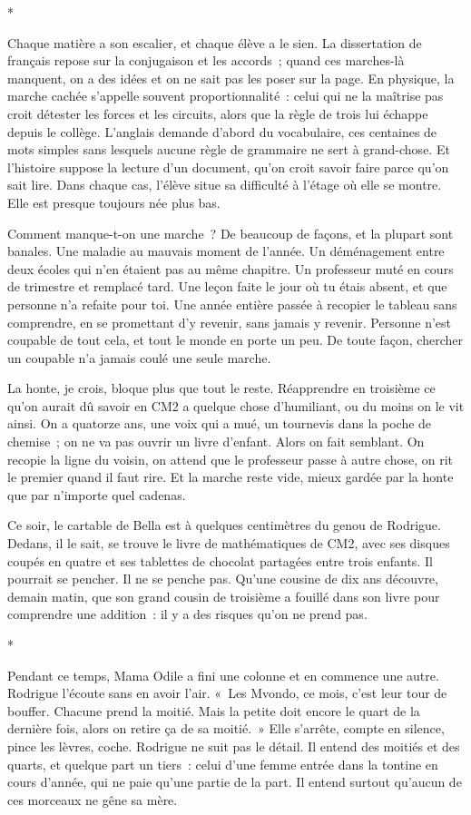 \documentclass[10.5pt,twoside,openright]{book}
\newcommand{\asterisme}{\par\vspace{0.7em}\centerline{\color{gris}*\quad*\quad*}\vspace{0.7em}\par\noindent}
\begin{document}
\asterisme

Chaque matière a son escalier, et chaque élève a le sien. La dissertation de français repose sur la conjugaison et les accords ; quand ces marches-là manquent, on a des idées et on ne sait pas les poser sur la page. En physique, la marche cachée s’appelle souvent proportionnalité : celui qui ne la maîtrise pas croit détester les forces et les circuits, alors que la règle de trois lui échappe depuis le collège. L’anglais demande d’abord du vocabulaire, ces centaines de mots simples sans lesquels aucune règle de grammaire ne sert à grand-chose. Et l’histoire suppose la lecture d’un document, qu’on croit savoir faire parce qu’on sait lire. Dans chaque cas, l’élève situe sa difficulté à l’étage où elle se montre. Elle est presque toujours née plus bas.

Comment manque-t-on une marche ? De beaucoup de façons, et la plupart sont banales. Une maladie au mauvais moment de l’année. Un déménagement entre deux écoles qui n’en étaient pas au même chapitre. Un professeur muté en cours de trimestre et remplacé tard. Une leçon faite le jour où tu étais absent, et que personne n’a refaite pour toi. Une année entière passée à recopier le tableau sans comprendre, en se promettant d’y revenir, sans jamais y revenir. Personne n’est coupable de tout cela, et tout le monde en porte un peu. De toute façon, chercher un coupable n’a jamais coulé une seule marche.

La honte, je crois, bloque plus que tout le reste. Réapprendre en troisième ce qu’on aurait dû savoir en CM2 a quelque chose d’humiliant, ou du moins on le vit ainsi. On a quatorze ans, une voix qui a mué, un tournevis dans la poche de chemise ; on ne va pas ouvrir un livre d’enfant. Alors on fait semblant. On recopie la ligne du voisin, on attend que le professeur passe à autre chose, on rit le premier quand il faut rire. Et la marche reste vide, mieux gardée par la honte que par n’importe quel cadenas.

Ce soir, le cartable de Bella est à quelques centimètres du genou de Rodrigue. Dedans, il le sait, se trouve le livre de mathématiques de CM2, avec ses disques coupés en quatre et ses tablettes de chocolat partagées entre trois enfants. Il pourrait se pencher. Il ne se penche pas. Qu’une cousine de dix ans découvre, demain matin, que son grand cousin de troisième a fouillé dans son livre pour comprendre une addition : il y a des risques qu’on ne prend pas.

\asterisme

Pendant ce temps, Mama Odile a fini une colonne et en commence une autre. Rodrigue l’écoute sans en avoir l’air. « Les Mvondo, ce mois, c’est leur tour de bouffer. Chacune prend la moitié. Mais la petite doit encore le quart de la dernière fois, alors on retire ça de sa moitié. » Elle s’arrête, compte en silence, pince les lèvres, coche. Rodrigue ne suit pas le détail. Il entend des moitiés et des quarts, et quelque part un tiers : celui d’une femme entrée dans la tontine en cours d’année, qui ne paie qu’une partie de la part. Il entend surtout qu’aucun de ces morceaux ne gêne sa mère.
\end{document}
